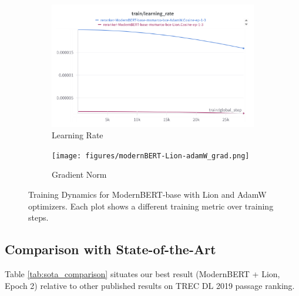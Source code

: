 \documentclass[conference]{IEEEtran}
\begin{document}
\begin{figure}[htbp]
\begin{subfigure}[b]{0.45\textwidth}
    \includegraphics[width=\linewidth]{figures/modernBERT-Lion-adamW-lrate.png}
    \caption{Learning Rate}
    \label{fig:modernbert_lr}
\end{subfigure}
\hfill
\begin{subfigure}[b]{0.45\textwidth}
    \texttt{[image: figures/modernBERT-Lion-adamW\_grad.png]}
    \caption{Gradient Norm}
    \label{fig:modernbert_grad}
\end{subfigure}

\caption{Training Dynamics for ModernBERT-base with Lion and AdamW optimizers. Each plot shows a different training metric over training steps.}
\label{fig:modernbert_training_plots}
\end{figure}



\subsection{Comparison with State-of-the-Art}
Table \ref{tab:sota_comparison} situates our best result (ModernBERT + Lion, Epoch 2) relative to other published results on TREC DL 2019 passage ranking.
\end{document}

